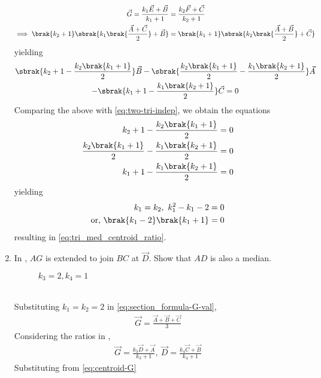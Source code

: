 \begin{enumerate}[label=\thesubsection.\arabic*.,ref=\thesubsection.\theenumi]
\begin{align}
\vec{G} = 
	   \frac{k_1\vec{E}+ \vec{B}}{k_1+1}
	  &= \frac{k_2\vec{F}+ \vec{C}}{k_2+1}
	  \\
	  \implies 
	   \brak{k_2+1}\sbrak{k_1\brak{\frac{\vec{A}+\vec{C}}{2}}+ \vec{B}}
	  &= \brak{k_1+1}\sbrak{k_2\brak{\frac{\vec{A}+\vec{B}}{2}}+ \vec{C}}
	  \label{eq:section_formula-G-val}
  \end{align}
  yielding
\begin{multline}
\sbrak{k_2+1-\frac{k_2\brak{k_1+1}}{2}}\vec{B}-\sbrak{\frac{k_2\brak{k_1+1}}{2}-\frac{k_1\brak{k_2+1}}{2}}\vec{A}
\\
-\sbrak{k_1+1-\frac{k_1\brak{k_2+1}}{2}}\vec{C}
	  =0 
\end{multline}
Comparing the above with 
	  \eqref{eq:two-tri-indep},
	  we obtain the equations
\begin{align}
k_2+1-\frac{k_2\brak{k_1+1}}{2}=0
\\
\frac{k_2\brak{k_1+1}}{2}-\frac{k_1\brak{k_2+1}}{2}=0
\\
k_1+1-\frac{k_1\brak{k_2+1}}{2}
	  =0 
\end{align}
yielding
\begin{align}
k_1=k_2
,\
k_1^2-k_1-2=0
\\
\text{or, }\brak{k_1 - 2}\brak{k_1+1} = 0
\end{align}
  resulting in 
\eqref{eq:tri_med_centroid_ratio}.
 \item 
In	,	
$AG$ is extended to join $BC$ at $\vec{D}$.  Show that $AD$ is also a median.
\begin{figure}[!ht]
	\begin{center}
		\resizebox{0.75\columnwidth}{!}{}
	\end{center}
	\caption{$k_3 = 2, k_4 =1$}
	\label{fig:tri_med_meet}	
\end{figure}
	\\
	\solution 
Substituting $k_1=k_2 = 2$ in \eqref{eq:section_formula-G-val},
\begin{align}
	\vec{G} = \frac{\vec{A}+\vec{B}+\vec{C}}{3}
	  \label{eq:centroid-G}
\end{align}
	Considering the ratios in 
	,	
  \begin{align}
\vec{G} = 
	  \frac{k_3\vec{D}+\vec{A} }{k_3+1} 
	  ,\
	\vec{D}  =\frac{k_4\vec{C}+\vec{B} }{k_4+1} 
  \end{align}
  Substituting from 
	  \eqref{eq:centroid-G}

\end{enumerate}
